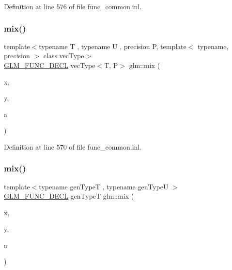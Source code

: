 Definition at line 576 of file func\+\_\+common.\+inl.

\mbox{\label{group__core__func__common_gaa51ef964cbf80ee9c2364d629693c8c8}} 
\subsubsection{\texorpdfstring{mix()}{mix()}\hspace{0.1cm}{\footnotesize\ttfamily [2/3]}}
{\footnotesize\ttfamily template$<$typename T , typename U , precision P, template$<$ typename, precision $>$ class vec\+Type$>$ \\
\mbox{\hyperlink{setup_8hpp_ab2d052de21a70539923e9bcbf6e83a51}{G\+L\+M\+\_\+\+F\+U\+N\+C\+\_\+\+D\+E\+CL}} vec\+Type$<$T, P$>$ glm\+::mix (\begin{DoxyParamCaption}\item[{vec\+Type$<$ T, P $>$ const \&}]{x,  }\item[{vec\+Type$<$ T, P $>$ const \&}]{y,  }\item[{U}]{a }\end{DoxyParamCaption})}



Definition at line 570 of file func\+\_\+common.\+inl.

\mbox{\label{group__core__func__common_ga8e93f374aae27d1a88b921860351f8d4}} 
\subsubsection{\texorpdfstring{mix()}{mix()}\hspace{0.1cm}{\footnotesize\ttfamily [3/3]}}
{\footnotesize\ttfamily template$<$typename gen\+TypeT , typename gen\+TypeU $>$ \\
\mbox{\hyperlink{setup_8hpp_ab2d052de21a70539923e9bcbf6e83a51}{G\+L\+M\+\_\+\+F\+U\+N\+C\+\_\+\+D\+E\+CL}} gen\+TypeT glm\+::mix (\begin{DoxyParamCaption}\item[{gen\+TypeT}]{x,  }\item[{gen\+TypeT}]{y,  }\item[{gen\+TypeU}]{a }\end{DoxyParamCaption})}



